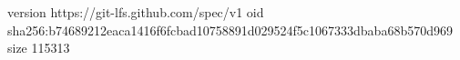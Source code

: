 version https://git-lfs.github.com/spec/v1
oid sha256:b74689212eaca1416f6fcbad10758891d029524f5c1067333dbaba68b570d969
size 115313
